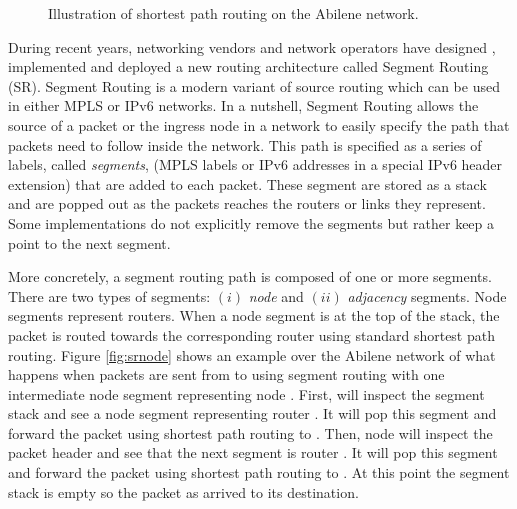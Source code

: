 \begin{figure}[H]
\begin{center}
\end{center}
\caption{Illustration of shortest path routing on the Abilene network.}
\label{fig:intro_sprouting}
\end{figure}

During recent years, networking vendors and network operators have
designed \cite{filsfils2015segment,rfc8402}, implemented
\cite{srdemo} and deployed \cite{schuller2017traffic,srdeploy} 
a new routing architecture called Segment Routing (SR). Segment
Routing is a modern variant of source routing which can be used in
either MPLS or IPv6 networks. In a nutshell, Segment Routing allows
the source of a packet or the ingress node in a network to easily
specify the path that packets need to follow inside the
network. This path is specified as a series of labels, called \emph{segments}, (MPLS labels or
IPv6 addresses in a special IPv6 header extension) that are added to
each packet. These segment are stored as a stack and are popped out as the packets reaches
the routers or links they represent. Some implementations do not explicitly remove the segments
but rather keep a point to the next segment.

More concretely, a segment routing path is composed of one or more segments. 
There are two types of segments: $(i)$ \emph{node} and $(ii)$ \emph{adjacency} segments. 
Node segments represent routers. When a node segment is at the top of the stack, the packet is routed towards the corresponding router using
standard shortest path routing. Figure \ref{fig:srnode} shows an example over the Abilene network of what happens when packets are
sent from  to  using segment routing with one intermediate node segment representing node . First,  will inspect the
segment stack and see a node segment representing router . It will pop this segment and forward the packet using
shortest path routing to . Then, node  will inspect the packet header and see that the next segment is router .
It will pop this segment and forward the packet using shortest path routing to . At this point the segment stack is empty so the
packet as arrived to its destination.

